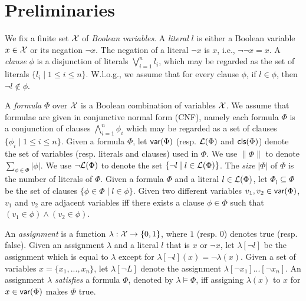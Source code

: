 \section{Preliminaries}\label{sec:prel}

We fix a finite set  $\mathcal{X}$ of \emph{Boolean variables}.
A \emph{literal} $l$ is either a Boolean variable $x\in \mathcal{X}$ or its negation $\neg x$.
The negation of a literal $\neg x$ is $x$, i.e., $\neg\neg x=x$.
A \emph{clause} $\phi$ is a disjunction of literals $\bigvee_{i=1}^n l_i$, which may be regarded as
the set of literals $\{l_i\mid 1\leq i\leq n\}$. W.l.o.g., we assume that for every
clause $\phi$, if $l\in\phi$, then $\neg l\not\in \phi$.

A \emph{formula} $\Phi$ over $\mathcal{X}$ is a Boolean combination of variables $\mathcal{X}$.
We assume that formulae are given in conjunctive normal
form (CNF), namely each formula $\Phi$ is a conjunction of clauses $\bigwedge_{i=1}^n\phi_i$ which may be regarded as a set of clauses $\{\phi_i\mid 1\leq i\leq n\}$. Given a formula $\Phi$, let $\textsf{var}(\Phi)$ (resp. $\Lit(\Phi)$  and $\textsf{cls}(\Phi)$) denote the set of variables (resp. literals and clauses) used in $\Phi$.
We use $\|\Phi\|$ to denote $\sum_{\phi\in\Phi}|\phi|$.
We use $\neg\Lit(\Phi)$ to denote the set $\{\neg l \mid l\in \Lit(\Phi)\}$.
The \emph{size} $|\Phi|$ of $\Phi$ is the number of literals of $\Phi$.
Given a formula $\Phi$ and a literal $l\in\Lit(\Phi)$,
let $\Phi_{l}\subseteq \Phi$ be the set of clauses $\{\phi\in\Phi\mid l\in\phi\}$.
Given two different variables $v_1, v_2\in\textsf{var}(\Phi)$, $v_1$ and $v_2$ are adjacent variables iff there exists a clause $\phi\in\Phi$ such that $(v_1\in\phi)\wedge(v_2\in\phi)$.


An \emph{assignment} is a function $\lambda: \mathcal{X} \rightarrow \{0,1\}$, where $1$ (resp. $0$) denotes true (resp. false).
Given an assignment $\lambda$ and a literal $l$ that is $x$ or $\neg x$, let $\lambda[\neg l]$ be the assignment which is equal to $\lambda$
except for $\lambda[\neg l](x)=\neg \lambda(x)$. Given a set of variables $x=\{x_1,...,x_n\}$, let $\lambda[\neg L]$ denote the assignment
$\lambda[\neg x_1]...[\neg x_n]$.
An assignment $\lambda$ \emph{satisfies} a formula $\Phi$, denoted by $\lambda\models \Phi$, iff assigning $\lambda(x)$ to $x$ for $x\in\textsf{var}(\Phi)$ makes $\Phi$ true.


